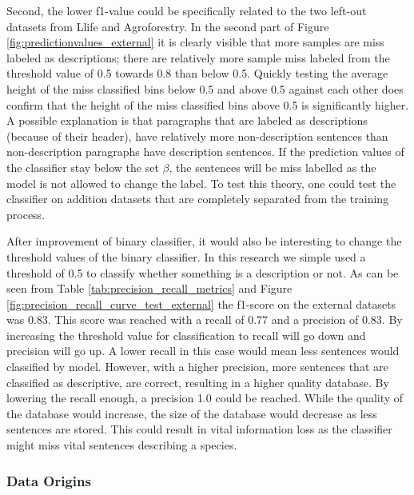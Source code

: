 \documentclass[a4paper, 12pt, oneside]{book} %
\begin{document}
Second, the lower f1-value could be specifically related to the two left-out datasets from Llife and Agroforestry.
In the second part of Figure \ref{fig:predictionvalues_external} it is clearly visible that more samples are miss labeled as descriptions; there are relatively more sample miss labeled from the threshold value of 0.5 towards 0.8 than below 0.5.
Quickly testing the average height of the miss classified bins below 0.5 and above 0.5 against each other does confirm that the height of the miss classified bins above 0.5 is significantly higher.
A possible explanation is that paragraphs that are labeled as descriptions (because of their header), have relatively more non-description sentences than non-description paragraphs have description sentences.
If the prediction values of the classifier stay below the set \(\beta\), the sentences will be miss labelled as the model is not allowed to change the label.
To test this theory, one could test the classifier on addition datasets that are completely separated from the training process.

After improvement of binary classifier, it would also be interesting to change the threshold values of the binary classifier.
In this research we simple used a threshold of 0.5 to classify whether something is a description or not.
As can be seen from Table \ref{tab:precision_recall_metrics} and Figure \ref{fig:precision_recall_curve_test_external} the f1-score on the external datasets was 0.83. 
This score was reached with a recall of 0.77 and a precision of 0.83.
By increasing the threshold value for classification to recall will go down and precision will go up.
A lower recall in this case would mean less sentences would classified by model.
However, with a higher precision, more sentences that are classified as descriptive, are correct, resulting in a higher quality database.
By lowering the recall enough, a precision 1.0 could be reached.
While the quality of the database would increase, the size of the database would decrease as less sentences are stored.
This could result in vital information loss as the classifier might miss vital sentences describing a species.

\subsubsection{Data Origins}
\end{document}
